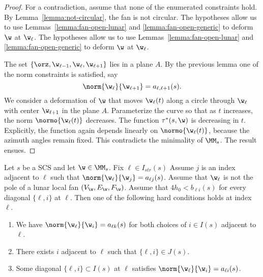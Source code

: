 \begin{proof} 
For a contradiction, assume that none of the enumerated constraints hold.
By Lemma~\ref{lemma:not-circular}, the fan is not circular.
The hypotheses
allow us to use Lemmas~\ref{lemma:fan-open-lunar} and
\ref{lemma:fan-open-generic} to deform $\w$ at $\w_\ell$.
The hypotheses
allow us to use Lemmas~\ref{lemma:fan-open-lunar} and
\ref{lemma:fan-open-generic} to deform $\w$ at $\w_\ell$.

The set $\{\orz,\w_{\ell-1},\w_\ell,\w_{\ell+1}\}$ lies in a plane $A$.
By the previous
lemma one of the norm constraints is satisfied, say
\[
\norm{\w_\ell}{\w_{\ell+1}}=a_{\ell,\ell+1}(s).
\]
We consider a  deformation of $\w$ that moves
 $\w_\ell(t)$ along a circle through
 $\w_\ell$ with center $\w_{\ell+1}$ in the plane $A$.  Parameterize the curve
so that as $t$ increases, the norm $\normo{\w_\ell(t)}$ decreases.
The function $\tau^*(s,\w)$ is decreasing in $t$.  Explicitly, the
function again depends linearly on $\normo{\w_\ell(t)}$, because
the azimuth angles remain fixed.  This contradicts the minimality of
$\MM_s$. 
The result ensues.
\end{proof}

\begin{lemma}\label{lemma:nux2}
Let $s$ be a SCS and let $\w\in \MM_s$.   Fix $\ell\in I_{str}(s)$
Assume $j$ is an index adjacent to $\ell$ such  that $\norm{\w_\ell}{\w_j}=a_{\ell j}(s)$.
Assume  that $\w_\ell$ is not the pole of a lunar local fan $(V_\w,E_\w,F_\w)$.
Assume that $4h_0 < b_{\ell i}(s)$ for every diagonal $\{\ell,i\}$ at $\ell$.
Then
one of the following hard conditions holds at index $\ell$.
\begin{enumerate}
\item We have $\norm{\w_\ell}{\w_i}=a_{\ell k}(s)$
for both choices of $i\in I(s)$ adjacent to $\ell$.
\item There exists $i$ adjacent to $\ell$ such that $\{\ell,i\}\in J(s)$.
\item Some diagonal $\{\ell,i\}\subset I(s)$ at $\ell$ satisfies
$\norm{\w_\ell}{\w_i}=a_{\ell i}(s)$.
\end{enumerate}
\end{lemma}

